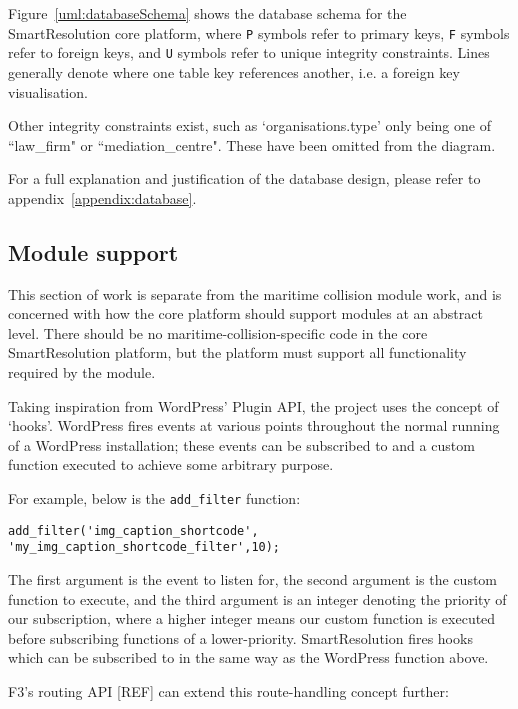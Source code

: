 Figure~\ref{uml:databaseSchema} shows the database schema for the SmartResolution core platform, where \lstinline{P} symbols refer to primary keys, \lstinline{F} symbols refer to foreign keys, and \lstinline{U} symbols refer to unique integrity constraints. Lines generally denote where one table key references another, i.e. a foreign key visualisation.

Other integrity constraints exist, such as `organisations.type' only being one of ``law\_firm" or ``mediation\_centre". These have been omitted from the diagram.

For a full explanation and justification of the database design, please refer to appendix~\ref{appendix:database}.

\subsection{Module support}

This section of work is separate from the maritime collision module work, and is concerned with how the core platform should support modules at an abstract level. There should be no maritime-collision-specific code in the core SmartResolution platform, but the platform must support all functionality required by the module.

Taking inspiration from WordPress' Plugin API, the project uses the concept of `hooks'. WordPress fires events at various points throughout the normal running of a WordPress installation; these events can be subscribed to and a custom function executed to achieve some arbitrary purpose.

For example, below is the \lstinline{add_filter} function:~\cite{wordpress:addFilter} 

\begin{lstlisting}
add_filter('img_caption_shortcode', 'my_img_caption_shortcode_filter',10);
\end{lstlisting}

The first argument is the event to listen for, the second argument is the custom function to execute, and the third argument is an integer denoting the priority of our subscription, where a higher integer means our custom function is executed before subscribing functions of a lower-priority. SmartResolution fires hooks which can be subscribed to in the same way as the WordPress function above.

F3's routing API [REF] can extend this route-handling concept further:~\cite{f3:routing}


